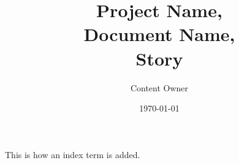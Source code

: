 \documentclass[x11names]{report}
\author{Content Owner}
\title{Project Name,\\ Document Name,\\ Story}
\date{\today}
\begin{document}
\maketitle
\thispagestyle{companypagestyle}

\lipsum

This is how an index term is added. 
\nocite{*}



\printindex
\end{document}
